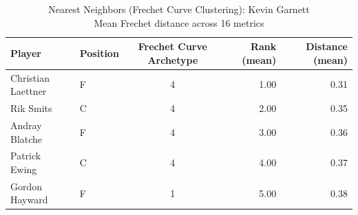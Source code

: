 \begin{table}[t]
\caption*{
{\fontsize{20}{25} Nearest Neighbors (Frechet Curve Clustering): Kevin Garnett\fontsize{12}{15}\selectfont } \\ 
{\fontsize{14}{17}\selectfont  Mean Frechet distance across 16 metrics\fontsize{12}{15}\selectfont }
} 
\fontsize{12.0pt}{14.0pt}\selectfont
\begin{tabular*}{\linewidth}{@{\extracolsep{\fill}}llcrr}
\toprule
Player & Position & Frechet Curve Archetype & Rank (mean) & Distance (mean) \\ 
\midrule\addlinespace[2.5pt]
Christian Laettner & F & 4 & 1.00 & 0.31 \\ 
Rik Smits & C & 4 & 2.00 & 0.35 \\ 
Andray Blatche & F & 4 & 3.00 & 0.36 \\ 
Patrick Ewing & C & 4 & 4.00 & 0.37 \\ 
Gordon Hayward & F & 1 & 5.00 & 0.38 \\ 
\bottomrule
\end{tabular*}
\end{table}

